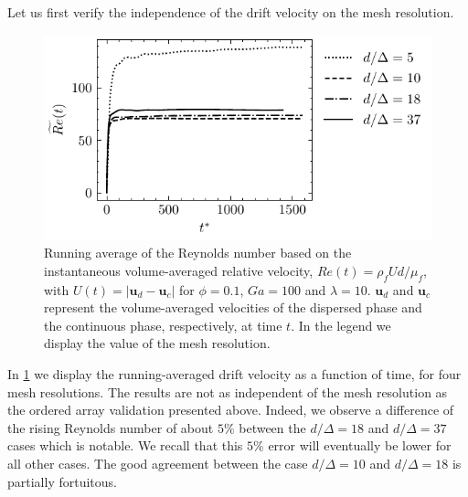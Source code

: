 Let us first verify the independence of the drift velocity on the mesh resolution. 
\begin{figure}[h!]
    \centering
    \includegraphics[height = 0.3\textwidth]{image/HOMOGENEOUS_NEW/VAL/Re.pdf}
    \caption{
        Running average of the Reynolds number based on the instantaneous volume-averaged relative velocity, $Re(t) = \rho_fUd /\mu_f$, with $U(t) = |\textbf{u}_d - \textbf{u}_c|$ for $\phi = 0.1$, $Ga=100$ and $\lambda =10$. $\textbf{u}_d$ and $\textbf{u}_c$ represent the volume-averaged velocities of the dispersed phase and the continuous phase, respectively, at time $t$.
        In the legend we display the value of the mesh resolution. 
    }
    \label{fig:Re}
\end{figure}
In \ref{fig:Re} we display the running-averaged drift velocity as a function of time, for four mesh resolutions. 
The results are not as independent of the mesh resolution as the ordered array validation presented above. 
Indeed, we observe a difference of the rising Reynolds number of about $5\%$ between the $d/\Delta = 18$ and $d/\Delta = 37$ cases which is notable.
We recall that this $5\%$ error will eventually be lower for all other cases. 
The good agreement between the case  $d/\Delta = 10$ and $d/\Delta = 18$ is partially fortuitous.

